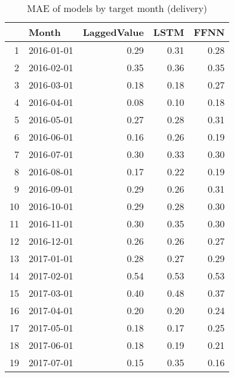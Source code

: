 \begin{table}[ht]
\centering
\begin{tabular}{rlrrr}
  \hline
 & Month & LaggedValue & LSTM & FFNN \\ 
  \hline
1 & 2016-01-01 & 0.29 & 0.31 & 0.28 \\ 
  2 & 2016-02-01 & 0.35 & 0.36 & 0.35 \\ 
  3 & 2016-03-01 & 0.18 & 0.18 & 0.27 \\ 
  4 & 2016-04-01 & 0.08 & 0.10 & 0.18 \\ 
  5 & 2016-05-01 & 0.27 & 0.28 & 0.31 \\ 
  6 & 2016-06-01 & 0.16 & 0.26 & 0.19 \\ 
  7 & 2016-07-01 & 0.30 & 0.33 & 0.30 \\ 
  8 & 2016-08-01 & 0.17 & 0.22 & 0.19 \\ 
  9 & 2016-09-01 & 0.29 & 0.26 & 0.31 \\ 
  10 & 2016-10-01 & 0.29 & 0.28 & 0.30 \\ 
  11 & 2016-11-01 & 0.30 & 0.35 & 0.30 \\ 
  12 & 2016-12-01 & 0.26 & 0.26 & 0.27 \\ 
  13 & 2017-01-01 & 0.28 & 0.27 & 0.29 \\ 
  14 & 2017-02-01 & 0.54 & 0.53 & 0.53 \\ 
  15 & 2017-03-01 & 0.40 & 0.48 & 0.37 \\ 
  16 & 2017-04-01 & 0.20 & 0.20 & 0.24 \\ 
  17 & 2017-05-01 & 0.18 & 0.17 & 0.25 \\ 
  18 & 2017-06-01 & 0.18 & 0.19 & 0.21 \\ 
  19 & 2017-07-01 & 0.15 & 0.35 & 0.16 \\ 
   \hline
\end{tabular}
\caption{MAE of models by target month (delivery)} 
\label{tab:mae_monthly}
\end{table}
